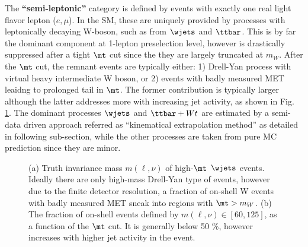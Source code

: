 The \textbf{``semi-leptonic''} category is defined by events with exactly one real light flavor lepton ($e,\mu$). In the SM, these are uniquely provided by processes with leptonically decaying W-boson, such as from $\wjets$ and $\ttbar$. This is by far the dominant component at 1-lepton preselection level, however is drastically suppressed after a tight $\mt$ cut since the they are largely truncated at $m_{W}$. After the $\mt$ cut, the remnant events are typically either: 1) Drell-Yan process with virtual heavy intermediate W boson, or 2) events with badly measured MET leaidng to prolonged tail in $\mt$. The former contribution is typically larger although the latter addresses more with increasing jet activity, as shown in Fig. \ref{fig::BGestimation::Wmassline}. The dominant processes $\wjets$ and $\ttbar+Wt$ are estimated by a semi-data driven approach referred as ``kinematical extrapolation method'' as detailed in following sub-section, while the other processes are taken from pure MC prediction since they are minor. \\
\begin{figure}[h]
  \centering
    \caption{ (a) Truth invariance mass $m(\ell,\nu)$ of high-$\mt$ $\wjets$ events. Ideally there are only high-mass Drell-Yan type of events, however due to the finite detector resolution, a fraction of on-shell W events with badly measured MET sneak into regions with $\mt>m_W$. (b) The fraction of on-shell events defined by $m(\ell,\nu) \in [60,125]$, as a function of the $\mt$ cut. It is generally below 50 $\%$, however increases with higher jet activity in the event. \label{fig::BGestimation::Wmassline} }
\end{figure}

